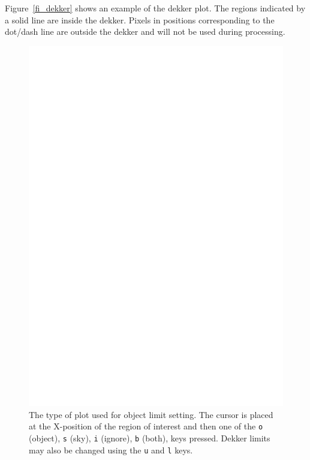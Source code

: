 \documentclass[twoside,11pt]{article}
\renewcommand{\_}{\texttt{\symbol{95}}}
\newcommand{\sunspec}[2]{#1}
\newcommand{\sunspec}[2]{#2}
\begin{document}
\sunspec{Figure~\ref{fi_dekker}}{The Figure above}
shows an example of the dekker plot. The regions
indicated by a solid line are inside the dekker. Pixels in positions
corresponding to the dot/dash line are outside the dekker and will not
be used during processing.

\begin{figure}
\begin{center}
\includegraphics[width=\textwidth]{sun152_05.eps}

\parbox{140mm}{
\caption{The type of plot used for object limit setting. The cursor is
placed at the X-position of the region of interest and then one of
the {\tt o} (object), {\tt s} (sky), {\tt i} (ignore), {\tt b}
(both), keys pressed. Dekker limits may also be changed using the
{\tt u} and {\tt l} keys.}
\label{fi_objlim}
}
\end{center}
\end{figure}
\end{document}
